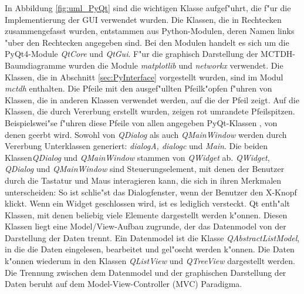 In Abbildung \ref{fig:uml_PyQt} sind die wichtigen Klasse aufgef"uhrt, die f"ur die Implementierung der GUI verwendet wurden. 
Die Klassen, die in Rechtecken zusammengefasst wurden, entstammen aus Python-Modulen, deren Namen links "uber den Rechtecken angegeben sind.
Bei den Modulen handelt es sich um die PyQt4-Module \textit{QtCore} und \textit{QtGui}. F"ur die graphisch Darstellung der MCTDH-Baumdiagramme
wurden die Module \textit{matplotlib} und \textit{networkx} verwendet. Die Klassen, die in Abschnitt \ref{sec:PyInterface} vorgestellt wurden,
sind im Modul \textit{mctdh} enthalten. Die Pfeile mit den ausgef"ullten Pfeilk"opfen  f"uhren von Klassen, die in anderen Klassen verwendet werden,
auf die der Pfeil zeigt.
Auf die Klassen, die durch Vererbung erstellt wurden, zeigen rot umrandete Pfeilspitzen. Beispielswei"se f"uhren diese Pfeile von allen angegeben PyQt-Klassen
, von denen geerbt wird.
Sowohl von \textit{QDialog} als auch \textit{QMainWindow} werden durch Vererbung Unterklassen generiert: \textit{dialogA, dialogc} und \textit{Main}. 
Die beiden Klassen\textit{QDialog} und \textit{QMainWindow} stammen von \textit{QWidget} ab. \textit{QWidget}, \textit{QDialog} und \textit{QMainWindow}
sind Steuerungselement, mit denen der Benutzer durch die Tastatur und Maus interagieren kann, die sich in ihren Merkmalen unterscheiden: So ist
schlie"st das Dialogfenster, wenn der Benutzer den X-Knopf klickt. Wenn ein Widget geschlossen wird, ist es lediglich versteckt. \cite{PyQt}
Qt enth"alt Klassen, mit denen beliebig viele Elemente dargestellt werden k"onnen. Diesen Klassen liegt eine Model/View-Aufbau zugrunde,
 der das Datenmodel von der Darstellung der Daten trennt. 
Ein Datenmodel ist die Klasse \textit{QAbstractListModel}, in die die Daten eingelesen, bearbeitet und gel"oscht werden k"onnen.
Die Daten k"onnen wiederum in den Klassen \textit{QListView} und \textit{QTreeView} dargestellt werden. 
Die Trennung zwischen dem Datenmodel und der graphischen Darstellung der Daten beruht auf dem Model-View-Controller (MVC) Paradigma.\cite{Qt}  

  




   
